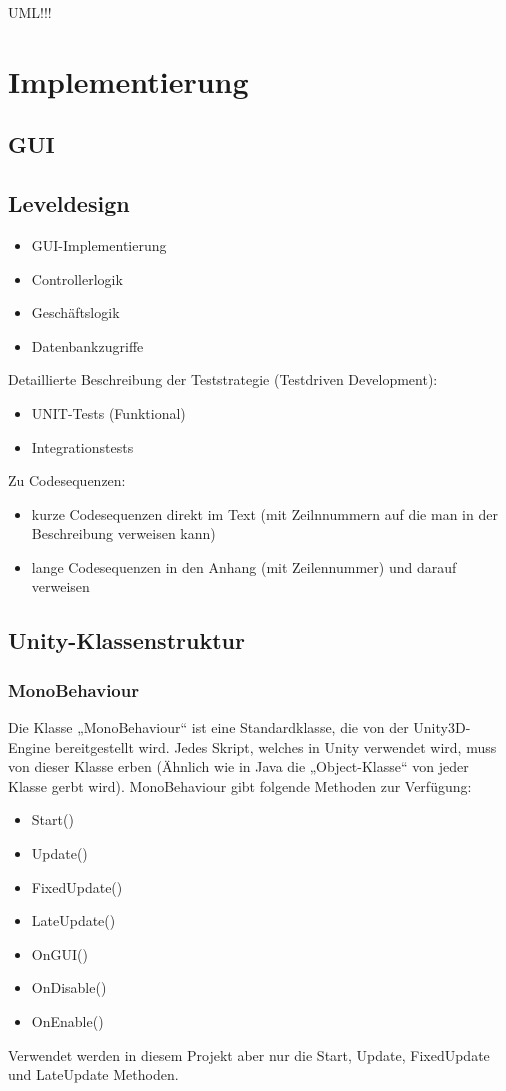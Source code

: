 UML!!!

\chapter{Implementierung}
\section{GUI}
\section{Leveldesign}

\begin{itemize}
	\item GUI-Implementierung
	\item Controllerlogik
	\item Geschäftslogik
	\item Datenbankzugriffe
\end{itemize}

Detaillierte Beschreibung der Teststrategie (Testdriven Development):

\begin{itemize}
	\item UNIT-Tests (Funktional)
	\item Integrationstests
\end{itemize}

Zu Codesequenzen:
\begin{itemize}	\item kurze Codesequenzen direkt im Text (mit Zeilnnummern auf die man in der Beschreibung verweisen kann)
	\item lange Codesequenzen in den Anhang (mit Zeilennummer) und darauf verweisen 
\end{itemize}

\section{Unity-Klassenstruktur}
\subsection{MonoBehaviour}	
Die Klasse „MonoBehaviour“ ist eine Standardklasse, die von der Unity3D-Engine bereitgestellt wird. Jedes Skript, welches in Unity verwendet wird, muss von dieser Klasse erben (Ähnlich wie in Java die „Object-Klasse“ von jeder Klasse gerbt wird). MonoBehaviour gibt folgende Methoden zur Verfügung:
\begin{itemize}
	\item Start()
	\item Update()
	\item FixedUpdate()
	\item LateUpdate()
	\item OnGUI()
	\item OnDisable()
	\item OnEnable()
\end{itemize}
Verwendet werden in diesem Projekt aber nur die Start, Update, FixedUpdate und LateUpdate Methoden.
